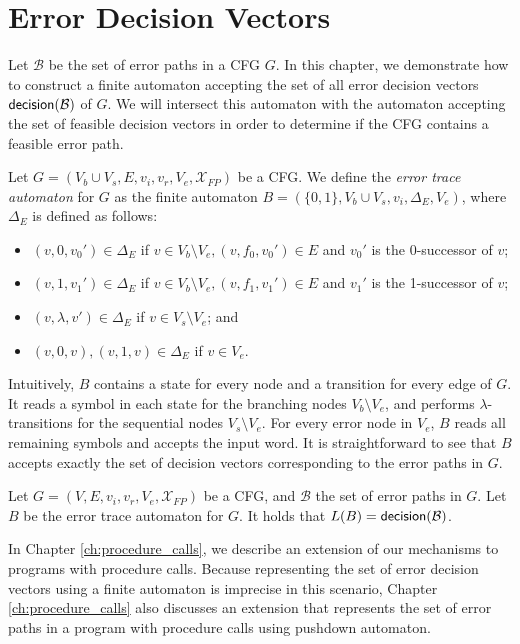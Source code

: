 \chapter{Error Decision Vectors}\label{ch:error}

Let $\mathcal{B}$ be the set of error paths in a CFG $G$. In this chapter, we demonstrate how to construct a finite automaton accepting the set of all error decision vectors $\mathsf{decision}(\mathcal{B})$ of $G$. We will intersect this automaton with the automaton accepting	the set of feasible decision vectors in order to determine if the CFG contains a feasible error path. 

\begin{definition}\label{def:err_error_automaton}
	Let $G = (V_b \cup V_s, E, v_i, v_r, V_e, \mathcal{X}_{FP})$ be a CFG. We define the \emph{error trace automaton} for $G$ as the finite automaton $B = (\{0,1\}, V_b \cup V_s, v_i, \Delta_E, V_e)$, where $\Delta_E$ is defined as follows: 
	\begin{itemize}
		\item $(v, 0, v_0')  \in \Delta_E$ if $v \in V_b \setminus V_e, (v, f_0, v_0') \in E$ and $v_0'$ is the 0-successor of $v$;
		\item $(v, 1, v_1')  \in \Delta_E$ if $v \in V_b \setminus V_e, (v, f_1, v_1') \in E$ and $v_1'$ is the 1-successor of $v$;
		\item $(v, \lambda, v') \in \Delta_E$ if $v \in V_s \setminus V_e$; and
		\item $(v, 0, v), (v, 1, v) \in \Delta_E$ if $v \in V_e$.
	\end{itemize}
\end{definition}

Intuitively, $B$ contains a state for every node and a transition for every edge of $G$. It reads a symbol in each state for the branching nodes $V_b \setminus V_e$, and performs $\lambda$-transitions for the sequential nodes $V_s \setminus V_e$. For every error node in $V_e$, $B$ reads all remaining symbols and accepts the input word. It is straightforward to see that $B$ accepts exactly the set of decision vectors corresponding to the error paths in $G$. 

\begin{lemma}\label{lem:err_error_automaton}
	Let $G = (V, E, v_i, v_r, V_e, \mathcal{X}_{FP})$ be a CFG, and $\mathcal{B}$ the set of error paths in $G$. Let $B$ be the error trace automaton for $G$. It holds that $L(B) = \mathsf{decision}(\mathcal{B})$. 
\end{lemma}

In Chapter \ref{ch:procedure_calls}, we describe an extension of our mechanisms to programs with procedure calls. Because representing the set of error decision vectors using a finite automaton is imprecise in this scenario, Chapter \ref{ch:procedure_calls} also discusses an extension that represents the set of error paths in a program with procedure calls using pushdown automaton.
